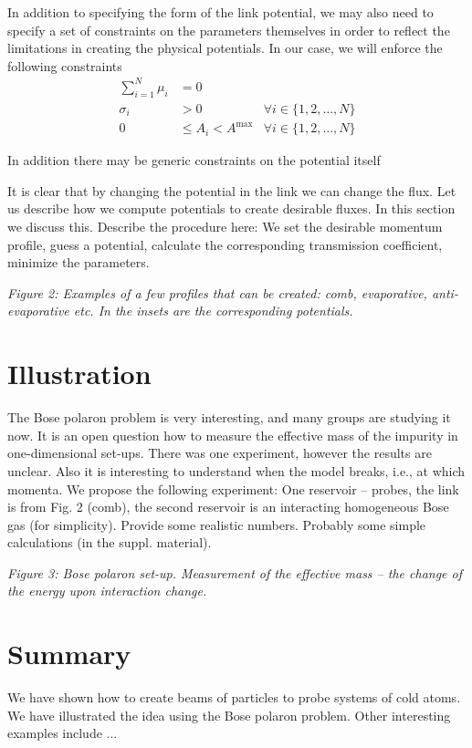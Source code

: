\documentclass[onecolumn,amsmath,amssymb,nofootinbib,prl]{revtex4-1}
\begin{document}
In addition to specifying the form of the link potential, we may also need to specify a set of constraints on the parameters themselves in order to reflect the limitations in creating the physical potentials. In our case, we will enforce the following constraints
\begin{align}
  \sum_{i=1}^{N}\mu_i &= 0 & \\
  \sigma_i &> 0 &\forall i \in\{1,2,\ldots,N\}\\
  0 &\leq A_i < A^\mathrm{max} &\forall i \in\{1,2,\ldots,N\}             
\end{align}

In addition there may be generic constraints on the potential itself 

 It is clear that by changing the potential in the link we can change the flux. Let us describe how we compute potentials to create desirable fluxes. In this section we discuss this.  Describe the procedure here: We set the desirable momentum profile, guess a potential, calculate the corresponding transmission coefficient, minimize the parameters. 

{\it Figure 2: Examples of a few profiles that can be created: comb, evaporative, anti-evaporative etc. In the insets are the corresponding potentials.}

\section{Illustration}

The Bose polaron problem is very interesting, and many groups are studying it now. It is an open question how to measure the effective mass of the impurity in one-dimensional set-ups. There was one experiment, however the results are unclear. Also it is interesting to understand when the model breaks, i.e., at which momenta. We propose the following experiment: One reservoir -- probes, the link is from Fig. 2 (comb), the second reservoir is an interacting homogeneous Bose gas (for simplicity). Provide some realistic numbers. Probably some simple calculations (in the suppl. material). 

{\it Figure 3: Bose polaron set-up. Measurement of the effective mass -- the change of the energy upon interaction change.}


\section{Summary} 

We have shown how to create beams of particles to probe systems of cold atoms. We have illustrated the idea using the Bose polaron problem. Other interesting examples include ... 






 
\end{document}
